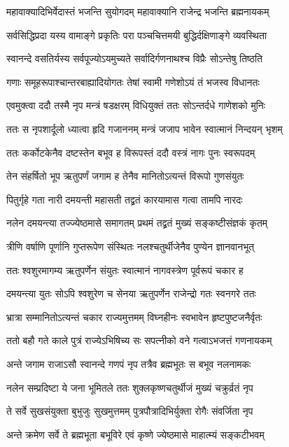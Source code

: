 \twolineshloka
{महावाक्यादिभिर्वेदास्तं भजन्ति सुयोगदम्}
{महावाक्यानि राजेन्द्र भजन्ति ब्रह्मनायकम्} %

\twolineshloka
{सर्वसिद्धिप्रदा यस्य वामाङ्गे प्रकृतिः परा}
{पञ्चचित्तमयी बुद्धिर्दक्षिणाङ्गे व्यवस्थिता} %

\twolineshloka
{स्वानन्दे वसतिर्यस्य सर्वपूज्योऽयमुच्यते}
{सर्वादिर्गणनाथश्च विप्रैः सोऽन्तेषु तिष्ठति} %

\twolineshloka
{गणाः समूहरूपाश्चान्तरबाह्यादियोगतः}
{तेषां स्वामी गणेशोऽयं तं भजस्व विधानतः} %

\twolineshloka
{एवमुक्त्वा ददौ तस्मै नृप मन्त्रं षडक्षरम्}
{विधियुक्तं ततः सोऽन्तर्दधे गाणेशको मुनिः} %

\twolineshloka
{ततः स नृपशार्दूलो ध्यात्वा हृदि गजाननम्}
{मन्त्रं जजाप भावेन स्वात्मानं निन्दयन् भृशम्} %

\twolineshloka
{ततः कर्कोटकेनैव दष्टस्तेन बभूव ह}
{विरूपस्तं ददौ वस्त्रं नागः पुनः स्वरूपदम्} %

\twolineshloka
{तेन संहर्षितो भूप ऋतुपर्णं जगाम ह}
{तेनैव मानितोऽत्यन्तं विरूपो गुणसंयुतः} %

\twolineshloka
{पितुर्गृहे गता नारी दमयन्ती महासती}
{तद्व्रतं कारयामास गत्वा तामपि नारदः} %

\twolineshloka
{नलेन दमयन्त्या तज्ज्येष्ठमासे समागतम्}
{प्रथमं तद्व्रतं मुख्यं सङ्कष्टीसंज्ञकं कृतम्} %

\twolineshloka
{त्रीणि वर्षाणि पूर्णानि गुप्तरूपेण संस्थितः}
{नलश्चतुर्थीजेनैव पुण्येन ज्ञानवानभूत्} %

\twolineshloka
{ततः श्वशुरमागम्य ऋतुपर्णेन संयुतः}
{स्वात्मानं नागवस्त्रेण पूर्वरूपं चकार ह} %

\twolineshloka
{दमयन्त्या युतः सोऽपि श्वशुरेण च सेनया}
{ऋतुपर्णेन राजेन्द्रो गतः स्वनगरे ततः} %

\twolineshloka
{भ्रात्रा सम्मानितोऽत्यन्तं चकार राज्यमुत्तमम्}
{विघ्नहीनः स्वभावेन हृष्टपुष्टजनैर्वृतः} %

\twolineshloka
{ततो बहौ गते काले पुत्रं राज्येऽभिषिच्य सः}
{सपत्नीको वने गत्वाऽभजत्तं गणनायकम्} %

\twolineshloka
{अन्ते जगाम राजाऽसौ स्वानन्दे गणपं नृप}
{तत्रैव ब्रह्मभूतः स बभूव नलनामकः} %

\twolineshloka
{नलेन सम्प्रदिष्टा ये जना भूमितले ततः}
{शुक्लकृष्णचतुर्थीजं मुख्यं चक्रुर्व्रतं नृप} %

\twolineshloka
{ते सर्वे सुखसंयुक्ता बुभुजुः सुखमुत्तमम्}
{पुत्रपौत्रादिभिर्युक्ता रोगैः संवर्जिता नृप} %

\twolineshloka
{अन्ते क्रमेण सर्वे ते ब्रह्मभूता बभूविरे}
{एवं कृष्णे ज्येष्ठमासे माहात्म्यं सङ्कटीभवम्} %


